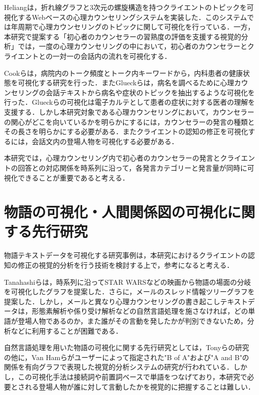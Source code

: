 \documentclass[shuuron]{kuee}
\begin{document}


Heliang\cite{shou}は，折れ線グラフと3次元の螺旋構造を持つクライエントのトピックを可視化するWebベースの心理カウンセリングシステムを実装した．このシステムでは年周期で心理カウンセリングのトピックに関して可視化を行っている．一方，本研究で提案する「初心者のカウンセラーの習熟度の評価を支援する視覚的分析」では，一度の心理カウンセリングの中において，初心者のカウンセラーとクライエントとの一対一の会話内の流れを可視化する．

Cookら\cite{cook2014monologger}は，病院内のトーク頻度とトーク内キーワードから，内科患者の健康状態を可視化する研究を行った．またGlueckら\cite{glueck2018phenolines}は，病名を調べるために心理カウンセリングの会話テキストから病名や症状のトピックを抽出するような可視化を行った．Glueckらの可視化は電子カルテとして患者の症状に対する医者の理解を支援する．しかし本研究対象である心理カウンセリングにおいて，カウンセラーの関心がどこを向いているかを明らかにするには，カウンセラーの発言の種類とその長さを明らかにする必要がある．またクライエントの認知の修正を可視化するには，会話文内の登場人物を可視化する必要がある．


本研究では，心理カウンセリング内で初心者のカウンセラーの発言とクライエントの回答との対応関係を時系列に沿って，各発言カテゴリーと発言量が同時に可視化できることが重要であると考える．


\section{物語の可視化・人間関係図の可視化に関する先行研究}%

物語テキストデータを可視化する研究事例は，本研究におけるクライエントの認知の修正の視覚的分析を行う技術を検討する上で，参考になると考える．

Tanahashiら\cite{tanahashi2012design}は，時系列に沿ってSTAR WARSなどの映画から物語の場面の分岐を可視化したグラフを提案した．さらに，メールのスレッド情報ツリーグラフを提案した\cite{tanahashi2015efficient}．しかし，メールと異なり心理カウンセリングの書き起こしテキストデータは，形態素解析や係り受け解析などの自然言語処理を施さなければ，どの単語が登場人物であるのか，また誰がその言動を発したかが判別できないため，分析などに利用することが困難である．

自然言語処理を用いた物語の可視化に関する先行研究としては，Tonyら\cite{bergstrom2007seeing}の研究の他に，Van Hamら\cite{van2009mapping}がユーザーによって指定された"B of A"および"A and B"の関係を有向グラフで表現した視覚的分析システムの研究が行われている．しかし，この可視化手法は接続詞や前置詞ベースで単語をつなげており，本研究で必要とされる登場人物が誰に対して言動したかを視覚的に把握することは難しい．
\end{document}
